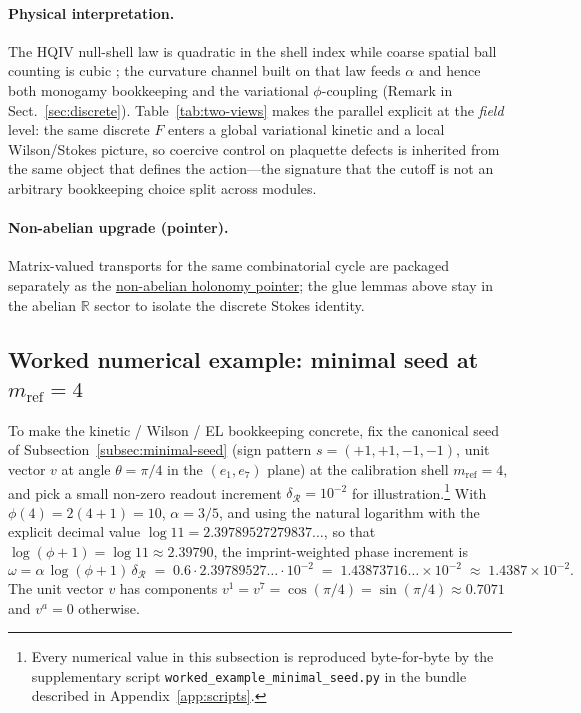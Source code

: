 \documentclass[11pt]{amsart}
\begin{document}
\paragraph{Physical interpretation.}
The HQIV null-shell law is quadratic in the shell index while coarse spatial ball counting is cubic \cite{hqiv-3d-growth-paper}; the curvature channel built on that law feeds \(\alpha\) and hence both monogamy bookkeeping and the variational \(\phi\)-coupling (Remark in Sect.~\ref{sec:discrete}). Table~\ref{tab:two-views} makes the parallel explicit at the \emph{field} level: the same discrete \(F\) enters a global variational kinetic and a local Wilson/Stokes picture, so coercive control on plaquette defects is inherited from the same object that defines the action---the signature that the cutoff is not an arbitrary bookkeeping choice split across modules.

\paragraph{Non-abelian upgrade (pointer).}
Matrix-valued transports for the same combinatorial cycle are packaged separately as the \hyperref[lean:non-abelian-pointer]{non-abelian holonomy pointer}; the glue lemmas above stay in the abelian \(\mathbb{R}\) sector to isolate the discrete Stokes identity.

\subsection{Worked numerical example: minimal seed at \texorpdfstring{$m_{\mathrm{ref}}=4$}{m\_ref=4}}
\label{subsec:worked-example}

To make the kinetic / Wilson / EL bookkeeping concrete, fix the canonical seed of Subsection~\ref{subsec:minimal-seed} (sign pattern \(s=(+1,+1,-1,-1)\), unit vector \(v\) at angle \(\theta=\pi/4\) in the \((e_1,e_7)\) plane) at the calibration shell \(m_{\mathrm{ref}}=4\), and pick a small non-zero readout increment \(\delta_{\mathcal{R}}=10^{-2}\) for illustration.\footnote{Every numerical value in this subsection is reproduced byte-for-byte by the supplementary script \texttt{worked\_example\_minimal\_seed.py} in the bundle described in Appendix~\ref{app:scripts}.} With \(\phi(4)=2(4+1)=10\), \(\alpha=3/5\), and using the natural logarithm with the explicit decimal value \(\log 11=2.39789527279837\ldots\), so that \(\log(\phi+1)=\log 11\approx 2.39790\), the imprint-weighted phase increment is
\[
\omega = \alpha\,\log(\phi+1)\,\delta_{\mathcal{R}}
       \;=\; 0.6\cdot 2.39789527\ldots\cdot 10^{-2}
       \;=\; 1.43873716\ldots\times 10^{-2}
       \;\approx\; 1.4387\times 10^{-2}.
\]
The unit vector \(v\) has components \(v^1=v^7=\cos(\pi/4)=\sin(\pi/4)\approx 0.7071\) and \(v^a=0\) otherwise.
\end{document}
